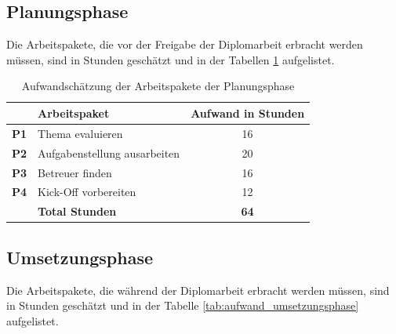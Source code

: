 \subsection{Planungsphase}
Die Arbeitspakete, die vor der Freigabe der Diplomarbeit erbracht werden müssen,
sind in Stunden geschätzt und in der Tabellen \ref{tab:auwand_planungsphase} 
aufgelistet.

\begin{table}[htbp]
\begin{center}
    \begin{tabular}{llc}
        \toprule & \textbf{Arbeitspaket} & \textbf{Aufwand in Stunden} \\
        \midrule \textbf{P1} & Thema evaluieren & 16 \\
        \midrule \textbf{P2} & Aufgabenstellung ausarbeiten & 20 \\
        \midrule \textbf{P3} & Betreuer finden & 16 \\
        \midrule \textbf{P4} & Kick-Off vorbereiten & 12 \\
        \bottomrule & \textbf{Total Stunden} & \textbf{64} \\
        \bottomrule
    \end{tabular}
    \caption{Aufwandschätzung der Arbeitspakete der Planungsphase}
    \label{tab:auwand_planungsphase}
\end{center}
\end{table}

\subsection{Umsetzungsphase}
Die Arbeitspakete, die während der Diplomarbeit erbracht werden müssen, sind
in Stunden geschätzt und in der Tabelle \ref{tab:aufwand_umsetzungsphase}
aufgelistet.

